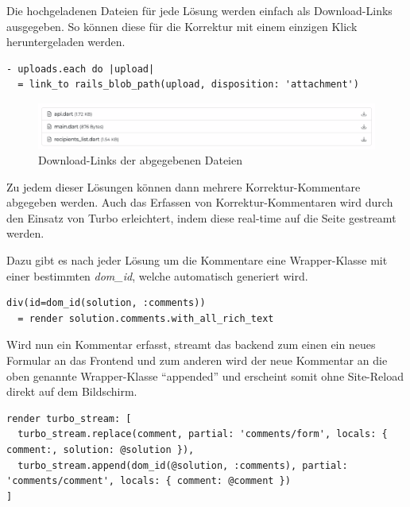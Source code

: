 Die hochgeladenen Dateien für jede Lösung werden einfach als Download-Links ausgegeben. 
So können diese für die Korrektur mit einem einzigen Klick heruntergeladen werden.

\begin{codebox}
\begin{verbatim}
- uploads.each do |upload|
  = link_to rails_blob_path(upload, disposition: 'attachment')
\end{verbatim}
\end{codebox}

\begin{figure}[H]
  \centering
  \includegraphics[width=\textwidth]{images/ui/download.png}
  \caption{\label{fig:download}Download-Links der abgegebenen Dateien}
\end{figure}

\newpage

Zu jedem dieser Lösungen können dann mehrere Korrektur-Kommentare abgegeben werden. Auch das Erfassen von Korrektur-Kommentaren wird durch den Einsatz von Turbo erleichtert,
indem diese real-time auf die Seite gestreamt werden.

Dazu gibt es nach jeder Lösung um die Kommentare eine Wrapper-Klasse mit einer bestimmten \emph{dom\_id}, welche automatisch
generiert wird.

\begin{codebox}
\begin{verbatim}
div(id=dom_id(solution, :comments))
  = render solution.comments.with_all_rich_text
\end{verbatim}
\end{codebox}

Wird nun ein Kommentar erfasst, streamt das backend zum einen ein neues Formular an das Frontend und zum anderen
wird der neue Kommentar an die oben genannte Wrapper-Klasse \enquote{appended} und erscheint somit ohne Site-Reload direkt auf dem Bildschirm.

\begin{codebox}
\begin{verbatim}
render turbo_stream: [
  turbo_stream.replace(comment, partial: 'comments/form', locals: { comment:, solution: @solution }),
  turbo_stream.append(dom_id(@solution, :comments), partial: 'comments/comment', locals: { comment: @comment })
]
\end{verbatim}
\end{codebox}
